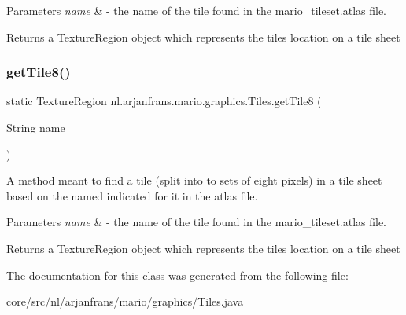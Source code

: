 \begin{DoxyParams}{Parameters}
{\em name} & -\/ the name of the tile found in the mario\+\_\+tileset.\+atlas file. \\
\hline
\end{DoxyParams}
\begin{DoxyReturn}{Returns}
a Texture\+Region object which represents the tile\textquotesingle{}s location on a tile sheet 
\end{DoxyReturn}
\mbox{\label{classnl_1_1arjanfrans_1_1mario_1_1graphics_1_1Tiles_aec062c35528937ca08a65a3e5b120d91}} 
\subsubsection{\texorpdfstring{get\+Tile8()}{getTile8()}}
{\footnotesize\ttfamily static Texture\+Region nl.\+arjanfrans.\+mario.\+graphics.\+Tiles.\+get\+Tile8 (\begin{DoxyParamCaption}\item[{String}]{name }\end{DoxyParamCaption})\hspace{0.3cm}{\ttfamily [static]}}



A method meant to find a tile (split into to sets of eight pixels) in a tile sheet based on the named indicated for it in the atlas file. 


\begin{DoxyParams}{Parameters}
{\em name} & -\/ the name of the tile found in the mario\+\_\+tileset.\+atlas file. \\
\hline
\end{DoxyParams}
\begin{DoxyReturn}{Returns}
a Texture\+Region object which represents the tile\textquotesingle{}s location on a tile sheet 
\end{DoxyReturn}


The documentation for this class was generated from the following file\+:\begin{DoxyCompactItemize}
\item 
core/src/nl/arjanfrans/mario/graphics/Tiles.\+java\end{DoxyCompactItemize}
